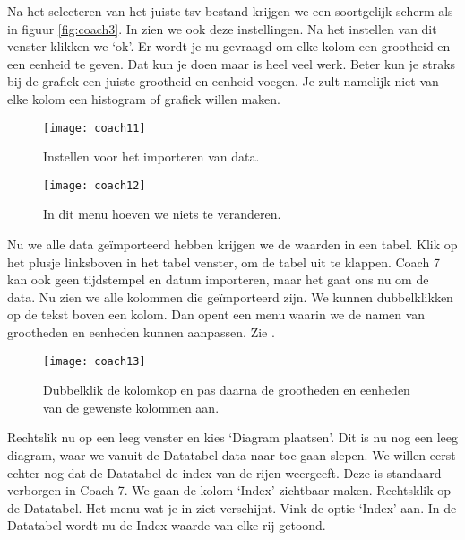 Na het selecteren van het juiste tsv-bestand krijgen we een soortgelijk scherm
als in figuur \ref{fig:coach3}. In  zien we ook deze instellingen.
Na het instellen van dit venster klikken we `ok'. Er wordt je nu gevraagd om elke
kolom een grootheid en een eenheid te geven. Dat kun je doen maar is heel veel
werk. Beter kun je straks bij de grafiek een juiste grootheid en eenheid voegen.
Je zult namelijk niet van elke kolom een histogram of grafiek willen maken.

\begin{figure}
    \centering
    \texttt{[image: coach11]}
    \caption{Instellen voor het importeren van data.}
    \label{fig:coach11}
\end{figure}

\begin{figure}
    \centering
    \texttt{[image: coach12]}
    \caption{In dit menu hoeven we niets te veranderen.}
    \label{fig:coach12}
\end{figure}

Nu we alle data geïmporteerd hebben krijgen we de waarden in een tabel. Klik op het plusje
linksboven in het tabel venster, om de tabel uit te klappen. Coach 7 kan ook
geen tijdstempel en datum importeren, maar het gaat ons nu om de data.
Nu zien we alle kolommen die geïmporteerd zijn. We kunnen dubbelklikken op
de tekst boven een kolom. Dan opent een menu waarin we de namen van grootheden en eenheden
kunnen aanpassen. Zie .

\begin{figure}
    \centering
    \texttt{[image: coach13]}
    \caption{Dubbelklik de kolomkop en pas daarna de grootheden en eenheden
    van de gewenste kolommen aan.}
    \label{fig:coach13}
\end{figure}

Rechtslik nu op een leeg venster en kies `Diagram plaatsen'. Dit is nu nog een leeg diagram,
waar we vanuit de Datatabel data naar toe gaan slepen. We willen eerst echter nog dat
de Datatabel de index van de rijen weergeeft. Deze is standaard verborgen in
Coach 7. We gaan de kolom `Index' zichtbaar maken. Rechtsklik op de Datatabel.
Het menu wat je in  ziet verschijnt.
Vink de optie `Index' aan. In de Datatabel wordt nu de Index waarde van elke rij getoond.


